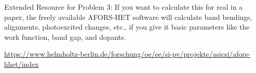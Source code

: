 \documentclass[12pt]{article}
\begin{document}
Extended Resource for Problem 3: If you want to calculate this for real in a paper, the freely available AFORS-HET software will calculate band bendings, alignments, photoexcited changes, etc., if you give it basic parameters like the work function, band gap, and dopants.

\href{https://www.helmholtz-berlin.de/forschung/oe/ee/si-pv/projekte/asicsi/afors-het/index}{https://www.helmholtz-berlin.de/forschung/oe/ee/si-pv/projekte/asicsi/afors-hhet/index}
\end{document}
